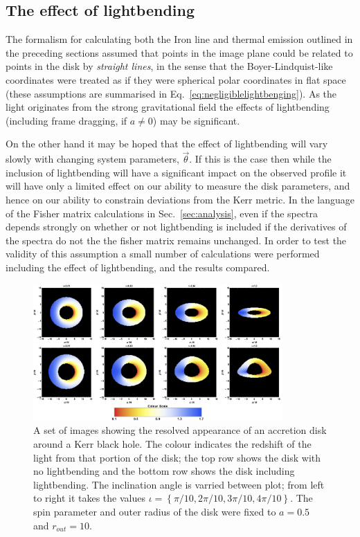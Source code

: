 \subsection{The effect of lightbending}\label{subsec:lightbendingcalcs}
The formalism for calculating both the Iron line and thermal emission outlined in the preceding sections assumed that points in the image plane could be related to points in the disk by \emph{straight lines}, in the sense that the Boyer-Lindquist-like coordinates were treated as if they were spherical polar coordinates in flat space (these assumptions are summarised in Eq.\ \ref{eq:negligiblelightbenging}). As the light originates from the strong gravitational field the effects of lightbending (including frame dragging, if $a\neq 0$) may be significant. 

On the other hand it may be hoped that the effect of lightbending will vary slowly with changing system parameters, $\vec{\theta}$. If this is the case then while the inclusion of lightbending will have a significant impact on the observed profile it will have only a limited effect on our ability to measure the disk parameters, and hence on our ability to constrain deviations from the Kerr metric. In the language of the Fisher matrix calculations in Sec.\ \ref{sec:analysis}, even if the spectra depends strongly on whether or not lightbending is included if the derivatives of the spectra do not the the fisher matrix remains unchanged. In order to test the validity of this assumption a small number of calculations were performed including the effect of lightbending, and the results compared.

\begin{figure}[t]
 \centering
 \includegraphics[trim=0cm 0cm 0cm 0cm, width=0.85\textwidth]{LightBendingDisk.png}
 \caption{A set of images showing the resolved appearance of an accretion disk around a Kerr black hole. The colour indicates the redshift of the light from that portion of the disk; the top row shows the disk with no lightbending and the bottom row shows the disk including lightbending. The inclination angle is varried between plot; from left to right it takes the values $\iota =\left\{\pi /10 , 2\pi /10 , 3\pi /10 , 4\pi /10 \right\}$. The spin parameter and outer radius of the disk were fixed to $a=0.5$ and $r_{out}=10$.}
 \label{fig:LightBendingDisk}
\end{figure}

